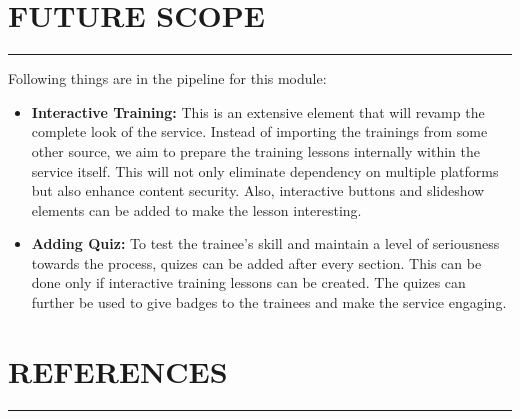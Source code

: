 \documentclass[a4paper,11pt]{article}
\begin{document}
\newpage
\section{FUTURE SCOPE}
\hrule
\vspace*{5mm}
Following things are in the pipeline for this module:
\begin{itemize}
    \item \textbf{Interactive Training: }This is an extensive element that will revamp the complete look of the service. Instead of importing the trainings from some other source, we aim to prepare the training lessons internally within the service itself. This will not only eliminate dependency on multiple platforms but also enhance content security. Also, interactive buttons and slideshow elements can be added to make the lesson interesting.
    \item \textbf{Adding Quiz: }To test the trainee's skill and maintain a level of seriousness towards the process, quizes can be added after every section. This can be done only if interactive training lessons can be created. The quizes can further be used to give badges to the trainees and make the service engaging.
\end{itemize}

\newpage
\section{REFERENCES}
\hrule
\vspace*{5mm}

 

\end{document}
